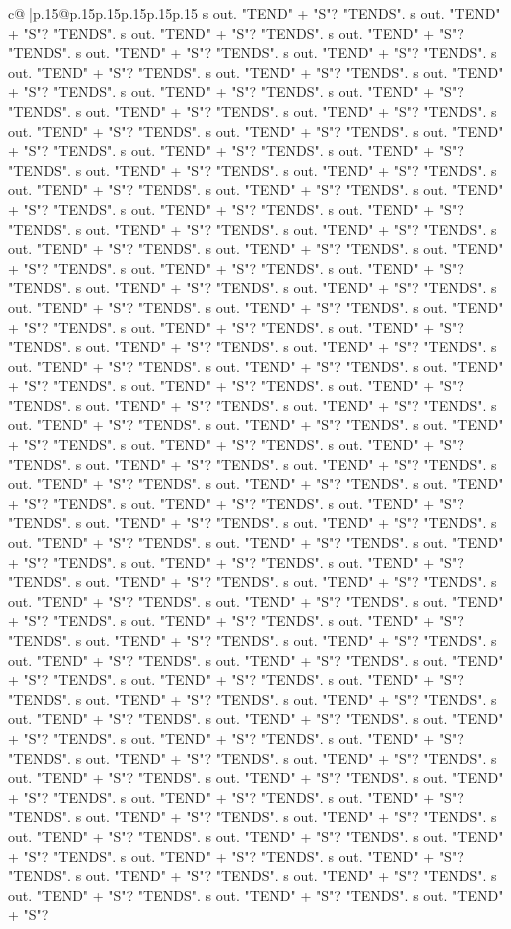 \documentclass{article}
\begin{document}
{\begin{supertabular}{c@{$\;$}|p{.15\linewidth}@{}p{.15\linewidth}p{.15\linewidth}p{.15\linewidth}p{.15\linewidth}p{.15\linewidth}}
{{{s out. "TEND" + "S"? "TENDS". s out. "TEND" + "S"? "TENDS". s out. "TEND" + "S"? "TENDS". s out. "TEND" + "S"? "TENDS". s out. "TEND" + "S"? "TENDS". s out. "TEND" + "S"? "TENDS". s out. "TEND" + "S"? "TENDS". s out. "TEND" + "S"? "TENDS". s out. "TEND" + "S"? "TENDS". s out. "TEND" + "S"? "TENDS". s out. "TEND" + "S"? "TENDS". s out. "TEND" + "S"? "TENDS". s out. "TEND" + "S"? "TENDS". s out. "TEND" + "S"? "TENDS". s out. "TEND" + "S"? "TENDS". s out. "TEND" + "S"? "TENDS". s out. "TEND" + "S"? "TENDS". s out. "TEND" + "S"? "TENDS". s out. "TEND" + "S"? "TENDS". s out. "TEND" + "S"? "TENDS". s out. "TEND" + "S"? "TENDS". s out. "TEND" + "S"? "TENDS". s out. "TEND" + "S"? "TENDS". s out. "TEND" + "S"? "TENDS". s out. "TEND" + "S"? "TENDS". s out. "TEND" + "S"? "TENDS". s out. "TEND" + "S"? "TENDS". s out. "TEND" + "S"? "TENDS". s out. "TEND" + "S"? "TENDS". s out. "TEND" + "S"? "TENDS". s out. "TEND" + "S"? "TENDS". s out. "TEND" + "S"? "TENDS". s out. "TEND" + "S"? "TENDS". s out. "TEND" + "S"? "TENDS". s out. "TEND" + "S"? "TENDS". s out. "TEND" + "S"? "TENDS". s out. "TEND" + "S"? "TENDS". s out. "TEND" + "S"? "TENDS". s out. "TEND" + "S"? "TENDS". s out. "TEND" + "S"? "TENDS". s out. "TEND" + "S"? "TENDS". s out. "TEND" + "S"? "TENDS". s out. "TEND" + "S"? "TENDS". s out. "TEND" + "S"? "TENDS". s out. "TEND" + "S"? "TENDS". s out. "TEND" + "S"? "TENDS". s out. "TEND" + "S"? "TENDS". s out. "TEND" + "S"? "TENDS". s out. "TEND" + "S"? "TENDS". s out. "TEND" + "S"? "TENDS". s out. "TEND" + "S"? "TENDS". s out. "TEND" + "S"? "TENDS". s out. "TEND" + "S"? "TENDS". s out. "TEND" + "S"? "TENDS". s out. "TEND" + "S"? "TENDS". s out. "TEND" + "S"? "TENDS". s out. "TEND" + "S"? "TENDS". s out. "TEND" + "S"? "TENDS". s out. "TEND" + "S"? "TENDS". s out. "TEND" + "S"? "TENDS". s out. "TEND" + "S"? "TENDS". s out. "TEND" + "S"? "TENDS". s out. "TEND" + "S"? "TENDS". s out. "TEND" + "S"? "TENDS". s out. "TEND" + "S"? "TENDS". s out. "TEND" + "S"? "TENDS". s out. "TEND" + "S"? "TENDS". s out. "TEND" + "S"? "TENDS". s out. "TEND" + "S"? "TENDS". s out. "TEND" + "S"? "TENDS". s out. "TEND" + "S"? "TENDS". s out. "TEND" + "S"? "TENDS". s out. "TEND" + "S"? "TENDS". s out. "TEND" + "S"? "TENDS". s out. "TEND" + "S"? "TENDS". s out. "TEND" + "S"? "TENDS". s out. "TEND" + "S"? "TENDS". s out. "TEND" + "S"? "TENDS". s out. "TEND" + "S"? "TENDS". s out. "TEND" + "S"? "TENDS". s out. "TEND" + "S"? "TENDS". s out. "TEND" + "S"? "TENDS". s out. "TEND" + "S"? "TENDS". s out. "TEND" + "S"? "TENDS". s out. "TEND" + "S"? "TENDS". s out. "TEND" + "S"? "TENDS". s out. "TEND" + "S"? "TENDS". s out. "TEND" + "S"? "TENDS". s out. "TEND" + "S"? "TENDS". s out. "TEND" + "S"? "TENDS". s out. "TEND" + "S"? "TENDS". s out. "TEND" + "S"? "TENDS". s out. "TEND" + "S"? "TENDS". s out. "TEND" + "S"? "TENDS". s out. "TEND" + "S"? "TENDS". s out. "TEND" + "S"? "TENDS". s out. "TEND" + "S"? "TENDS". s out. "TEND" + "S"? "TENDS". s out. "TEND" + "S"? "TENDS". s out. "TEND" + "S"? "TENDS". s out. "TEND" + "S"? "TENDS". s out. "TEND" + "S"? "TENDS". s out. "TEND" + "S"? "TENDS". s out. "TEND" + "S"? "TENDS". s out. "TEND" + "S"? "TENDS". s out. "TEND" + "S"? "TENDS". s out. "TEND" + "S"? }}}
\end{supertabular}}
\end{document}
